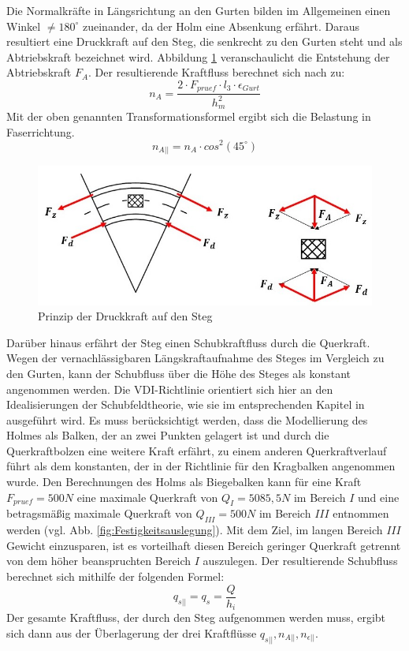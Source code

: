 \noindent Die Normalkräfte in Längsrichtung an den Gurten bilden im Allgemeinen einen Winkel $ \neq180^{\circ} $ zueinander, da der Holm eine Absenkung erfährt. Daraus resultiert eine Druckkraft auf den Steg, die senkrecht zu den Gurten steht und als Abtriebskraft bezeichnet wird. Abbildung \ref{fig: Abtriebskraft} veranschaulicht die Entstehung der Abtriebskraft $ F_{A} $. Der resultierende Kraftfluss berechnet sich nach \cite{item5} zu:
\begin{equation}\label{na}
	n_{A}=\frac{2\cdot F_{pruef}\cdot l_{3}\cdot\epsilon_{Gurt}}{h_{m}^{2}}
\end{equation}
 Mit der oben genannten Transformationsformel ergibt sich die Belastung in Faserrichtung.
 \begin{equation}
 	n_{A||}=n_{A}\cdot cos^{2}\left(45^{\circ} \right)
 \end{equation} 

\begin{figure}[h]
	\includegraphics[width=1.0\textwidth]{Bilder/Abtriebskraft.jpg}
	\caption{Prinzip der Druckkraft auf den Steg}
	\label{fig: Abtriebskraft}
\end{figure}
\noindent Darüber hinaus erfährt der Steg einen Schubkraftfluss durch die Querkraft. Wegen der vernachlässigbaren Längskraftaufnahme des Steges im Vergleich zu den Gurten, kann der Schubfluss über die Höhe des Steges als konstant angenommen werden. Die VDI-Richtlinie orientiert sich hier an den Idealisierungen der Schubfeldtheorie, wie sie im entsprechenden Kapitel in \cite{item15} ausgeführt wird. Es muss berücksichtigt werden, dass die Modellierung des Holmes als Balken, der an zwei Punkten gelagert ist und durch die Querkraftbolzen eine weitere Kraft erfährt, zu einem anderen Querkraftverlauf führt als dem konstanten, der in der Richtlinie für den Kragbalken angenommen wurde. Den Berechnungen des Holms als Biegebalken kann für eine Kraft $ F_{pruef}=500N $ eine maximale Querkraft von $ Q_{I}=5085,5N $ im Bereich $ I $ und eine betragsmäßig maximale Querkraft von $Q_{III}=500N $ im Bereich $ III $ entnommen werden (vgl. Abb. \ref{fig:Festigkeitsauslegung}). Mit dem Ziel, im langen Bereich $ III $ Gewicht einzusparen, ist es vorteilhaft diesen Bereich geringer Querkraft getrennt von dem höher beanspruchten Bereich $ I $ auszulegen. Der resultierende Schubfluss berechnet sich mithilfe der folgenden Formel:\\
\begin{equation}\label{qs}
	q_{s||}=q_{s}=\frac{Q}{h_{i}} 
\end{equation}
Der gesamte Kraftfluss, der durch den Steg aufgenommen werden muss, ergibt sich dann aus der Überlagerung der drei Kraftflüsse $q_{s||}, n_{A||}, n_{\epsilon||} $. 

